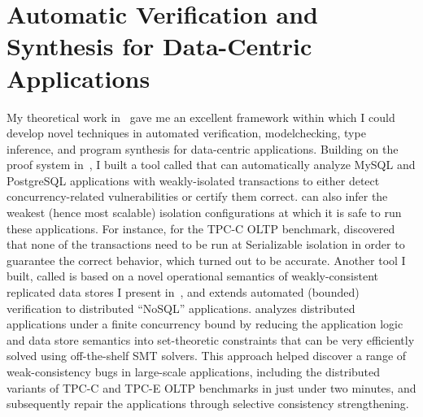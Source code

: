 \section*{Automatic Verification and Synthesis for Data-Centric
Applications}

My theoretical work in~\cite{popl18, oopsla18, ecoop18} gave me an
excellent framework within which I could develop novel techniques in
automated verification, modelchecking, type inference, and program
synthesis for data-centric applications. Building on the proof system
in~\cite{popl18}, I built a tool called \acidifier that can
automatically analyze MySQL and PostgreSQL applications with
weakly-isolated transactions to either detect concurrency-related
vulnerabilities or certify them correct.  \acidifier can  also infer
the weakest (hence most scalable) isolation configurations at which it
is safe to run these applications. For instance, for the TPC-C OLTP
benchmark, \acidifier discovered that none of the transactions need to
be run at Serializable isolation in order to guarantee the correct
behavior, which turned out to be accurate. Another tool I built,
called \qnine is based on a novel operational semantics of
weakly-consistent replicated data stores I present
in~\cite{oopsla18}, and extends automated (bounded) verification to
distributed ``NoSQL'' applications. \qnine analyzes distributed
applications under a finite concurrency bound by reducing the
application logic and data store semantics into set-theoretic
constraints that can be very efficiently solved using off-the-shelf
SMT solvers. This approach helped \qnine discover a range of
weak-consistency bugs in large-scale applications, including the
distributed variants of TPC-C and TPC-E OLTP benchmarks in just under
two minutes, and subsequently repair the applications through
selective consistency strengthening.

